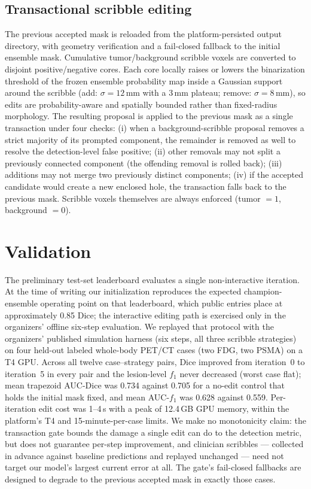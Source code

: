 \documentclass[runningheads]{llncs}
\begin{document}
\subsection{Transactional scribble editing}
The previous accepted mask is reloaded from the platform-persisted output
directory, with geometry verification and a fail-closed fallback to the
initial ensemble mask. Cumulative tumor/background scribble voxels are
converted to disjoint positive/negative cores. Each core locally raises or
lowers the binarization threshold of the frozen ensemble probability map
inside a Gaussian support around the scribble (add: $\sigma=12$\,mm with a
3\,mm plateau; remove: $\sigma=8$\,mm), so edits are probability-aware and
spatially bounded rather than fixed-radius morphology. The resulting
proposal is applied to the previous mask as a single transaction under
four checks: (i) when a background-scribble proposal removes a strict
majority of its prompted component, the remainder is removed as well to
resolve the detection-level false positive; (ii) other removals may not
split a previously connected component (the offending removal is rolled
back); (iii) additions may not merge two previously distinct components;
(iv) if the accepted candidate would create a new enclosed hole, the
transaction falls back to the previous mask. Scribble voxels themselves
are always enforced (tumor $=1$, background $=0$).

\section{Validation}

The preliminary test-set leaderboard evaluates a single non-interactive
iteration. At the time of writing our initialization reproduces the
expected champion-ensemble operating point on that leaderboard, which
public entries place at approximately 0.85 Dice; the interactive editing
path is exercised only in the organizers' offline six-step evaluation. We
replayed that protocol with the organizers' published simulation harness
(six steps, all three scribble strategies) on four held-out labeled
whole-body PET/CT cases (two FDG, two PSMA) on a T4 GPU. Across all
twelve case--strategy pairs, Dice improved from iteration~0 to
iteration~5 in every pair and the lesion-level $f_1$ never decreased
(worst case flat); mean trapezoid AUC-Dice was 0.734 against 0.705 for a
no-edit control that holds the initial mask fixed, and mean AUC-$f_1$ was
0.628 against 0.559. Per-iteration edit cost was 1--4\,s with a peak of
12.4\,GB GPU memory, within the platform's T4 and 15-minute-per-case
limits. We make no monotonicity claim: the transaction gate
bounds the damage a single edit can do to the detection metric, but does
not guarantee per-step improvement, and clinician scribbles --- collected
in advance against baseline predictions and replayed unchanged --- need
not target our model's largest current error at all. The gate's fail-closed
fallbacks are designed to degrade to the previous accepted mask in exactly
those cases.
\end{document}
